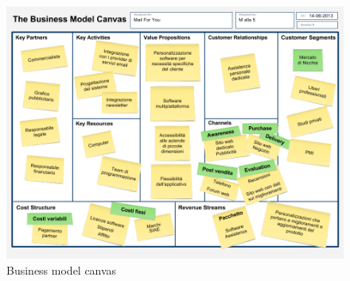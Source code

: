 \begin{figure}[H]
\centering
\includegraphics[scale=0.4]{img/canvasM4Y}
\caption{Business model canvas}
\label{fig: business model canvas}
\end{figure}